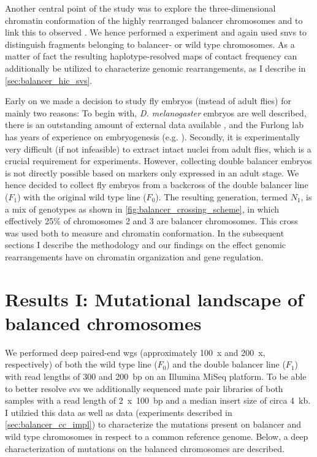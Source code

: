 Another central point of the study was to explore the three-dimensional
chromatin conformation of the highly rearranged balancer chromosomes and to link
this to observed \ase. We hence performed a \hic
experiment and again used \acp{snv} to distinguish fragments belonging to
balancer- or wild type chromosomes. As a matter of fact the resulting
haplotype-resolved maps of contact frequency can additionally be utilized to
characterize genomic rearrangements, as I describe in \cref{sec:balancer_hic_svs}.

Early on we made a decision to study fly embryos (instead of adult flies) for
mainly two reasons: To begin with, \textit{D. melanogaster} embryos are well
described, there is an outstanding amount of external data available
\citep{Gramates2017,Celniker2009}, and the Furlong lab has years of experience
on embryogenesis (e.g. \cite{Furlong2001,Ghavi-Helm2014}). Secondly,
it is experimentally very difficult (if not infeasible) to extract intact
nuclei from adult flies, which is a crucial requirement for \hic experiments.
However, collecting double balancer embryos is not directly possible
based on markers only expressed in an adult stage. We hence decided
to collect fly embryos from a backcross of the double balancer line ($F_1$) with
the original wild type line ($F_0$). The resulting generation, termed $N_1$, is a
mix of genotypes as shown in \cref{fig:balancer_crossing_scheme}, in which
effectively 25\% of chromosomes 2 and 3 are balancer chromosomes. This cross
was used both to measure \ase and chromatin conformation. In the subsequent
sections I describe the methodology and our findings on the effect genomic
rearrangements have on chromatin organization and gene regulation.









\section{Results I: Mutational landscape of balanced chromosomes}
\label{sec:balancer_mutational_landscape}

We performed deep paired-end \acf{wgs} (approximately 100~x and 200~x, respectively)
of both the wild type line ($F_0$) and the double balancer line ($F_1$) with
read lengths of 300 and 200~bp on an Illumina MiSeq platform. To be able to
better resolve \acp{sv} we additionally sequenced mate pair libraries of both
samples with a read length of 2~x~100~bp and a median insert size of circa 4~kb.
I utilzied this data as well as \hic data (experiments described in
\cref{sec:balancer_cc_impl}) to characterize the mutations present on balancer
and wild type chromosomes in respect to a common reference genome. Below, a deep
characterization of mutations on the balanced chromosomes are described.



